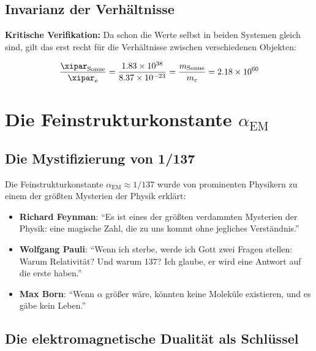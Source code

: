 	\subsection{Invarianz der Verhältnisse}
	\label{subsec:xi_verhaeltnis_invarianz}
	
	\textbf{Kritische Verifikation:} Da schon die Werte selbst in beiden Systemen gleich sind, gilt das erst recht für die Verhältnisse zwischen verschiedenen Objekten:
	
	\begin{equation}
		\frac{\xipar_{\text{Sonne}}}{\xipar_{\text{e}}} = \frac{1.83 \times 10^{38}}{8.37 \times 10^{-23}} = \frac{m_{\text{Sonne}}}{m_e} = 2.18 \times 10^{60}
	\end{equation}
	
	
\section{Die Feinstrukturkonstante $\alpha_{\text{EM}}$}
\label{sec:alpha_em}

\subsection{Die Mystifizierung von 1/137}
\label{subsec:alpha_mystification}

Die Feinstrukturkonstante $\alpha_{\text{EM}} \approx 1/137$ wurde von prominenten Physikern zu einem der größten Mysterien der Physik erklärt:

\begin{itemize}
	\item \textbf{Richard Feynman}: ``Es ist eines der größten verdammten Mysterien der Physik: eine magische Zahl, die zu uns kommt ohne jegliches Verständnis.''
	\item \textbf{Wolfgang Pauli}: ``Wenn ich sterbe, werde ich Gott zwei Fragen stellen: Warum Relativität? Und warum 137? Ich glaube, er wird eine Antwort auf die erste haben.''
	\item \textbf{Max Born}: ``Wenn $\alpha$ größer wäre, könnten keine Moleküle existieren, und es gäbe kein Leben.''
\end{itemize}

\subsection{Die elektromagnetische Dualität als Schlüssel}
\label{subsec:electromagnetic_duality}

